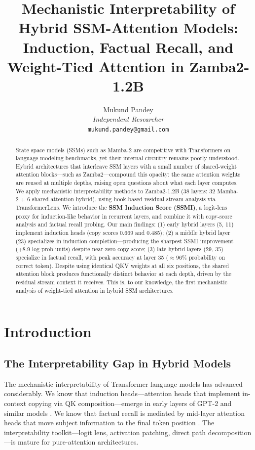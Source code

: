 \documentclass[11pt,a4paper]{article}
\title{\textbf{Mechanistic Interpretability of Hybrid SSM-Attention Models:\\
Induction, Factual Recall, and Weight-Tied Attention in Zamba2-1.2B}}
\author{
  Mukund Pandey \\
  \textit{Independent Researcher} \\
  \texttt{mukund.pandey@gmail.com}
}
\date{}
\begin{document}
\maketitle

\begin{abstract}
State space models (SSMs) such as Mamba-2 are competitive with Transformers on language modeling benchmarks, yet their internal circuitry remains poorly understood. Hybrid architectures that interleave SSM layers with a small number of shared-weight attention blocks---such as Zamba2---compound this opacity: the same attention weights are reused at multiple depths, raising open questions about what each layer computes. We apply mechanistic interpretability methods to Zamba2-1.2B (38 layers: 32 Mamba-2 + 6 shared-attention hybrid), using hook-based residual stream analysis via TransformerLens. We introduce the \textbf{SSM Induction Score (SSMI)}, a logit-lens proxy for induction-like behavior in recurrent layers, and combine it with copy-score analysis and factual recall probing. Our main findings: (1) early hybrid layers (5, 11) implement induction heads (copy scores 0.669 and 0.485); (2) a middle hybrid layer (23) specializes in induction completion---producing the sharpest SSMI improvement (+8.9 log-prob units) despite near-zero copy score; (3) late hybrid layers (29, 35) specialize in factual recall, with peak accuracy at layer 35 (${\approx}96\%$ probability on correct token). Despite using identical QKV weights at all six positions, the shared attention block produces functionally distinct behavior at each depth, driven by the residual stream context it receives. This is, to our knowledge, the first mechanistic analysis of weight-tied attention in hybrid SSM architectures.
\end{abstract}

\section{Introduction}

\subsection{The Interpretability Gap in Hybrid Models}

The mechanistic interpretability of Transformer language models has advanced considerably. We know that induction heads---attention heads that implement in-context copying via QK composition---emerge in early layers of GPT-2 and similar models \citep{olsson2022context}. We know that factual recall is mediated by mid-layer attention heads that move subject information to the final token position \citep{meng2022locating}. The interpretability toolkit---logit lens, activation patching, direct path decomposition---is mature for pure-attention architectures.
\end{document}
